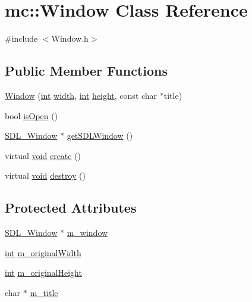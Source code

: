\hypertarget{classmc_1_1_window}{}\section{mc\+:\+:Window Class Reference}
\label{classmc_1_1_window}


{\ttfamily \#include $<$Window.\+h$>$}

\subsection*{Public Member Functions}
\begin{DoxyCompactItemize}
\item 
\hyperlink{classmc_1_1_window_a55f349e85260b2cab01941534df62954}{Window} (\hyperlink{_s_d_l__thread_8h_a6a64f9be4433e4de6e2f2f548cf3c08e}{int} \hyperlink{_s_d_l__opengl_8h_a9a82cf3caff84cabc4598e2619faac17}{width}, \hyperlink{_s_d_l__thread_8h_a6a64f9be4433e4de6e2f2f548cf3c08e}{int} \hyperlink{_s_d_l__opengl_8h_aa352f2804b9902ac30769c00dde75d5f}{height}, const char $\ast$title)
\item 
bool \hyperlink{classmc_1_1_window_acefbda4736db354ba98cef6d6489a0f1}{is\+Open} ()
\item 
\hyperlink{_s_d_l__video_8h_a55a196c7d3b8497538632c79ae1e6392}{S\+D\+L\+\_\+\+Window} $\ast$ \hyperlink{classmc_1_1_window_a741a653af7b767e39a1d517fd1844674}{get\+S\+D\+L\+Window} ()
\item 
virtual \hyperlink{_s_d_l__opengles2__gl2ext_8h_ae5d8fa23ad07c48bb609509eae494c95}{void} \hyperlink{classmc_1_1_window_ac9844e316c03c49e69528bd3a345a58d}{create} ()
\item 
virtual \hyperlink{_s_d_l__opengles2__gl2ext_8h_ae5d8fa23ad07c48bb609509eae494c95}{void} \hyperlink{classmc_1_1_window_a2f62d5937f19a26c0d8349efd1ce75bd}{destroy} ()
\end{DoxyCompactItemize}
\subsection*{Protected Attributes}
\begin{DoxyCompactItemize}
\item 
\hyperlink{_s_d_l__video_8h_a55a196c7d3b8497538632c79ae1e6392}{S\+D\+L\+\_\+\+Window} $\ast$ \hyperlink{classmc_1_1_window_a8df84ee7c278f016ef13ac0ede008f7c}{m\+\_\+window}
\item 
\hyperlink{_s_d_l__thread_8h_a6a64f9be4433e4de6e2f2f548cf3c08e}{int} \hyperlink{classmc_1_1_window_a1f4c4744822006d438a532282d2b36c5}{m\+\_\+original\+Width}
\item 
\hyperlink{_s_d_l__thread_8h_a6a64f9be4433e4de6e2f2f548cf3c08e}{int} \hyperlink{classmc_1_1_window_aef96e2ff220e319a9a87cf4ced39ddaf}{m\+\_\+original\+Height}
\item 
char $\ast$ \hyperlink{classmc_1_1_window_a27f0a568dfe2d21915debc0672dd072e}{m\+\_\+title}
\end{DoxyCompactItemize}
